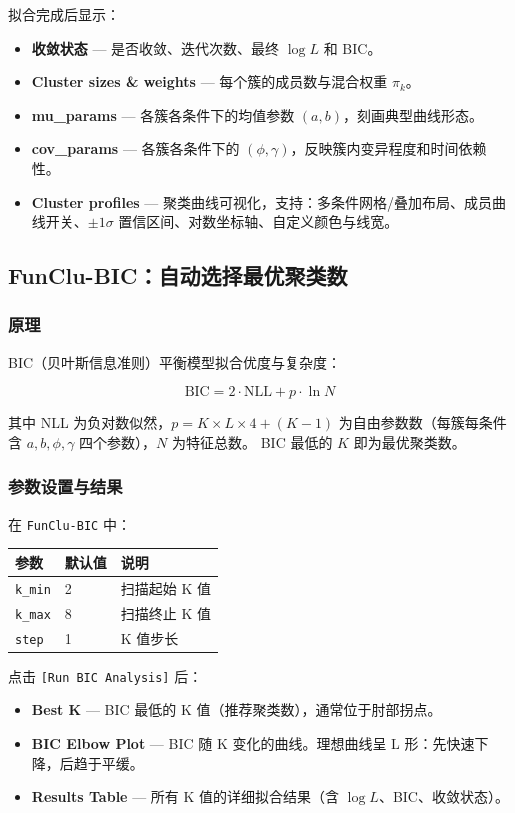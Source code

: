\documentclass[12pt,a4paper]{ctexart}
\makeatletter
\newcommand{\btn}[1]{\texttt{[#1]}}
\newcommand{\tab}[1]{\texttt{#1}}
\newcommand{\param}[1]{\texttt{#1}}
\newcommand{\paramtable}[1]{%
    \begin{center}
    \small
    \begin{tabular}{@{}llp{5.5cm}@{}}
    \toprule
    \textbf{参数} & \textbf{默认值} & \textbf{说明} \\
    \midrule
    #1
    \bottomrule
    \end{tabular}
    \end{center}
}
\makeatother
\begin{document}
拟合完成后显示：

\begin{itemize}[leftmargin=*]
    \item \textbf{收敛状态} --- 是否收敛、迭代次数、最终 $\log L$ 和 BIC。
    \item \textbf{Cluster sizes \& weights} --- 每个簇的成员数与混合权重 $\pi_k$。
    \item \textbf{mu\_params} --- 各簇各条件下的均值参数 $(a, b)$，刻画典型曲线形态。
    \item \textbf{cov\_params} --- 各簇各条件下的 $(\phi, \gamma)$，反映簇内变异程度和时间依赖性。
    \item \textbf{Cluster profiles} --- 聚类曲线可视化，支持：多条件网格/叠加布局、成员曲线开关、$\pm 1\sigma$ 置信区间、对数坐标轴、自定义颜色与线宽。
\end{itemize}

\subsection{FunClu-BIC：自动选择最优聚类数}

\subsubsection{原理}

BIC（贝叶斯信息准则）平衡模型拟合优度与复杂度：

\[
\text{BIC} = 2 \cdot \text{NLL} + p \cdot \ln N
\]

其中 NLL 为负对数似然，$p = K \times L \times 4 + (K - 1)$ 为自由参数数（每簇每条件含 $a, b, \phi, \gamma$ 四个参数），$N$ 为特征总数。
BIC 最低的 $K$ 即为最优聚类数。

\subsubsection{参数设置与结果}

在 \tab{FunClu-BIC} 中：

\paramtable{
    \param{k\_min} & 2 & 扫描起始 K 值\\
    \param{k\_max} & 8 & 扫描终止 K 值\\
    \param{step} & 1 & K 值步长\\
}

点击 \btn{Run BIC Analysis} 后：

\begin{itemize}[leftmargin=*]
    \item \textbf{Best K} --- BIC 最低的 K 值（推荐聚类数），通常位于肘部拐点。
    \item \textbf{BIC Elbow Plot} --- BIC 随 K 变化的曲线。理想曲线呈 L 形：先快速下降，后趋于平缓。
    \item \textbf{Results Table} --- 所有 K 值的详细拟合结果（含 $\log L$、BIC、收敛状态）。
\end{itemize}
\end{document}
